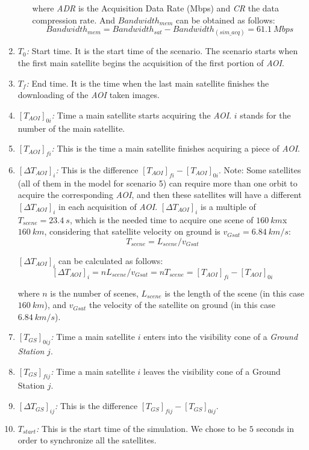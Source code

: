 \begin{enumerate}
\begin{itemize}
where \emph{ADR} is the Acquisition Data Rate (Mbps) and \emph{CR} the data
compression rate. And $Bandwidth_{mem}$ can be obtained as follows:
\begin{equation}\label{eq:bandwidth-mem}
  Bandwidth_{mem}=Bandwidth_{sat}-Bandwidth_{(sim\_acq)}=61.1~Mbps
\end{equation}
\end{itemize}

\item \emph{$T_0$:} Start time. It is the start time of the scenario. The scenario starts when the first main satellite begins the acquisition of the first portion of \emph{AOI}.
\item \emph{$T_f$:} End time. It is the time when the last main satellite finishes the downloading of the \emph{AOI} taken images.
\item \emph{$[T_{AOI}]_{0i}$:} Time a main satellite starts acquiring the \emph{AOI}. $i$ stands for the number of the main satellite.
\item \emph{$[T_{AOI}]_{fi}$:} This is the time a main satellite finishes acquiring a piece of \emph{AOI}.
\item \emph{$[\Delta T_{AOI}]_i$:} This is the difference
  $[T_{AOI}]_{fi}-[T_{AOI}]_{0i}$. Note: Some satellites (all of them in the
  model for scenario 5) can require more than one orbit to acquire the
  corresponding \emph{AOI}, and then these satellites will have a different
  $[\Delta T_{AOI}]_i$ in each acquisition of \emph{AOI}. $[\Delta T_{AOI}]_i$
  is a multiple of  $T_{scene}=23.4~s$, which is the needed time to acquire one
  scene of $160~km$x $160~km$, considering that satellite velocity on ground is
  $v_{Gsat}=6.84~km/s$:
\begin{equation}\label{eq:Tscene}
	T_{scene}=L_{scene}/v_{Gsat}
\end{equation}

$[\Delta T_{AOI}]_i$  can be calculated as follows:
\begin{equation}\label{eq:deltataoi}
[\Delta T_{AOI}]_i=n L_{scene}/v_{Gsat} =nT_{scene}=[T_{AOI}]_{fi}-[T_{AOI}]_{0i}
\end{equation}

where $n$ is the number of scenes, $L_{scene}$  is the length of the scene (in
this case $160~km$), and $v_{Gsat}$ the velocity of the satellite on ground (in this case $6.84~km/s$).
\item \emph{$[T_{GS}]_{0ij}$:} Time a main satellite $i$ enters into the visibility cone of a \emph{Ground Station} $j$.
\item \emph{$[T_{GS}]_{fij}$:} Time a main satellite $i$ leaves the visibility cone of a Ground Station  $j$.
\item \emph{$[\Delta T_{GS}]_{ij}$:} This is the difference $[T_{GS}]_{fij}-[T_{GS}]_{0ij}.$
\item \emph{$T_{start}$:} This is the start time of the simulation. We chose to be $5$ seconds in order to synchronize all the satellites.

\end{enumerate}

